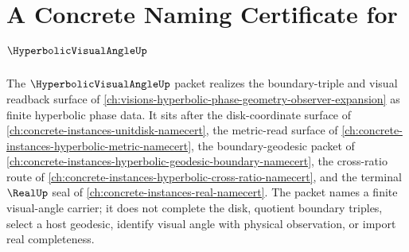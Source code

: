 \chapter{A Concrete Naming Certificate for $\HyperbolicVisualAngleUp$}
\label{ch:concrete-instances-hyperbolic-visual-angle-namecert}

The $\HyperbolicVisualAngleUp$ packet realizes the boundary-triple and visual readback surface of \autoref{ch:visions-hyperbolic-phase-geometry-observer-expansion} as finite hyperbolic phase data. It sits after the disk-coordinate surface of \autoref{ch:concrete-instances-unitdisk-namecert}, the metric-read surface of \autoref{ch:concrete-instances-hyperbolic-metric-namecert}, the boundary-geodesic packet of \autoref{ch:concrete-instances-hyperbolic-geodesic-boundary-namecert}, the cross-ratio route of \autoref{ch:concrete-instances-hyperbolic-cross-ratio-namecert}, and the terminal $\RealUp$ seal of \autoref{ch:concrete-instances-real-namecert}. The packet names a finite visual-angle carrier; it does not complete the disk, quotient boundary triples, select a host geodesic, identify visual angle with physical observation, or import real completeness.

